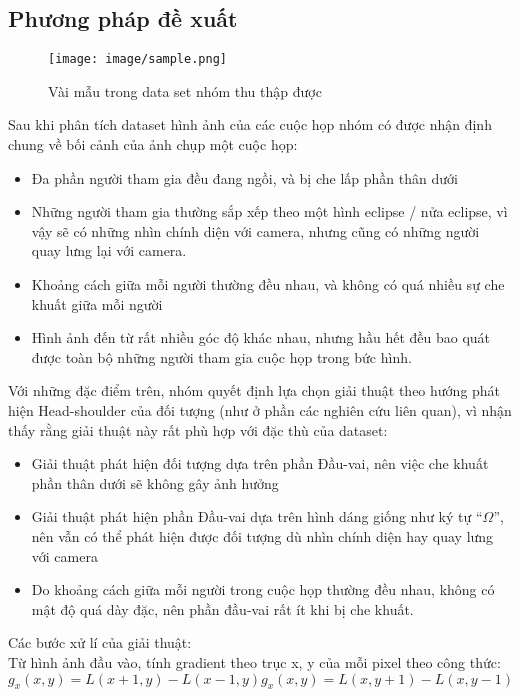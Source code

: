 \documentclass[12pt,a4paper]{article}
\begin{document}
		\subsection{Phương pháp đề xuất}

		\begin{figure}[H]
		    \centering
		    \texttt{[image: image/sample.png]}
		    \caption{Vài mẫu trong data set nhóm thu thập được \cite{DataSet}}
		    \label{fig:my_label}
		\end{figure}
Sau khi phân tích dataset hình ảnh của các cuộc họp \cite{DataSet} nhóm có được nhận định chung về bối cảnh của ảnh chụp một cuộc họp:
    \begin{itemize}
        \item Đa phần người tham gia đều đang ngồi, và bị che lấp phần thân dưới
        \item Những người tham gia thường sắp xếp theo một hình eclipse / nửa eclipse, vì vậy sẽ có những nhìn chính diện với camera, nhưng cũng có những người quay lưng lại với camera.
        \item Khoảng cách giữa mỗi người thường đều nhau, và không có quá nhiều sự che khuất giữa mỗi người
        \item Hình ảnh đến từ rất nhiều góc độ khác nhau, nhưng hầu hết đều bao quát được toàn bộ những người tham gia cuộc họp trong bức hình.
    \end{itemize}
Với những đặc điểm trên, nhóm quyết định lựa chọn giải thuật theo hướng phát hiện Head-shoulder của đối tượng (như ở phần các nghiên cứu liên quan), vì nhận thấy rằng giải thuật này rất phù hợp với đặc thù của dataset:
    \begin{itemize}
        \item Giải thuật phát hiện đối tượng dựa trên phần Đầu-vai, nên việc che khuất phần thân dưới sẽ không gây ảnh hưởng
        \item Giải thuật phát hiện phần Đầu-vai dựa trên hình dáng giống như ký tự “$\Omega$”, nên vẫn có thể phát hiện được đối tượng dù nhìn chính diện hay quay lưng với camera
        \item Do khoảng cách giữa mỗi người trong cuộc họp thường đều nhau, không có mật độ quá dày đặc, nên phần đầu-vai rất ít khi bị che khuất.
    \end{itemize}
 Các bước xử lí của giải thuật:\\
 Từ hình ảnh đầu vào, tính gradient theo trục x, y của mỗi pixel theo công thức:
 \begin{equation}
    g_x(x,y) = L(x+1,y) - L(x-1,y)
    g_x(x,y) = L(x,y+1) - L(x,y-1)
 \end{equation}
\end{document}
